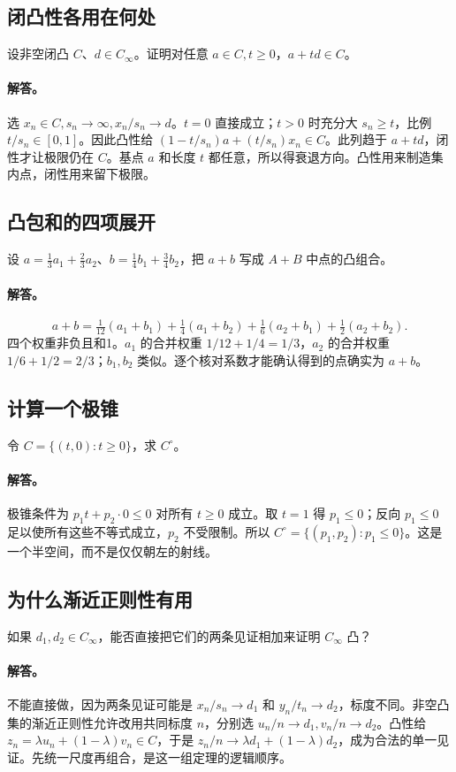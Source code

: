 \documentclass[11pt,a4paper]{article}
\theoremstyle{definition}\newtheorem{definition}{定义}\newtheorem{example}{例}
\begin{document}
\subsection{闭凸性各用在何处}
设非空闭凸 $C$、$d\in C_\infty$。证明对任意 $a\in C,t\ge0$，$a+td\in C$。
\paragraph{解答。}选 $x_n\in C,s_n\to\infty,x_n/s_n\to d$。$t=0$ 直接成立；$t>0$ 时充分大 $s_n\ge t$，比例 $t/s_n\in[0,1]$。因此凸性给 $(1-t/s_n)a+(t/s_n)x_n\in C$。此列趋于 $a+td$，闭性才让极限仍在 $C$。基点 $a$ 和长度 $t$ 都任意，所以得衰退方向。凸性用来制造集内点，闭性用来留下极限。
\subsection{凸包和的四项展开}
设 $a=\tfrac13a_1+\tfrac23a_2$、$b=\tfrac14b_1+\tfrac34b_2$，把 $a+b$ 写成 $A+B$ 中点的凸组合。
\paragraph{解答。}
\[a+b=\tfrac1{12}(a_1+b_1)+\tfrac14(a_1+b_2)
+\tfrac16(a_2+b_1)+\tfrac12(a_2+b_2).
\]
四个权重非负且和1。$a_1$ 的合并权重 $1/12+1/4=1/3$，$a_2$ 的合并权重 $1/6+1/2=2/3$；$b_1,b_2$ 类似。逐个核对系数才能确认得到的点确实为 $a+b$。
\subsection{计算一个极锥}
令 $C=\{(t,0):t\ge0\}$，求 $C^\circ$。
\paragraph{解答。}极锥条件为 $p_1t+p_2\cdot0\le0$ 对所有 $t\ge0$ 成立。取 $t=1$ 得 $p_1\le0$；反向 $p_1\le0$ 足以使所有这些不等式成立，$p_2$ 不受限制。所以 $C^\circ=\{(p_1,p_2):p_1\le0\}$。这是一个半空间，而不是仅仅朝左的射线。
\subsection{为什么渐近正则性有用}
如果 $d_1,d_2\in C_\infty$，能否直接把它们的两条见证相加来证明 $C_\infty$ 凸？
\paragraph{解答。}不能直接做，因为两条见证可能是 $x_n/s_n\to d_1$ 和 $y_n/t_n\to d_2$，标度不同。非空凸集的渐近正则性允许改用共同标度 $n$，分别选 $u_n/n\to d_1,v_n/n\to d_2$。凸性给 $z_n=\lambda u_n+(1-\lambda)v_n\in C$，于是 $z_n/n\to\lambda d_1+(1-\lambda)d_2$，成为合法的单一见证。先统一尺度再组合，是这一组定理的逻辑顺序。
\end{document}
